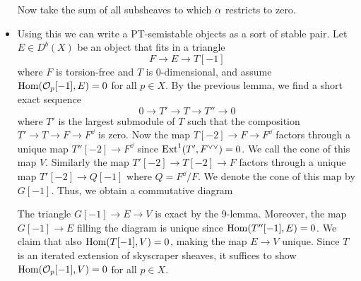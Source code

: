 \begin{itemize}
    Now take the sum of all subsheaves to which $\alpha$ restricts to zero. 
    
    \item Using this we can write a PT-semistable objects as a sort of stable pair. Let $E \in D^b(X)$ be an object that fits in a triangle
    \[ F \to E \to T[-1] \]
    where $F$ is torsion-free and $T$ is 0-dimensional, and assume $\mathrm{Hom}(\mathcal{O}_p[-1], E) = 0$ for all $p \in X$. By the previous lemma, we find a short exact sequence 
    \[ 0 \to T' \to T \to T'' \to 0 \]
    where $T'$ is the largest submodule of $T$ such that the composition $T' \to T \to F \to F^\dd$ is zero. Now the map $T[-2] \to F \to F^\dd$ factors through a unique map $T''[-2] \to F^\dd$ since $\mathrm{Ext}^1(T', F^{\vee\vee}) = 0$. We call the cone of this map $V$. Similarly the map $T'[-2] \to T[-2] \to F$ factors through a unique map $T'[-2] \to Q[-1]$ where $Q = F^\dd/F$. We denote the cone of this map by $G[-1]$. Thus, we obtain a commutative diagram
    \begin{center}
    \end{center}
    The triangle $G[-1] \to E \to V$ is exact by the 9-lemma. Moreover, the map $G[-1] \to E$ filling the diagram is unique since $\mathrm{Hom}(T''[-1], E) = 0$. We claim that also $\mathrm{Hom}(T[-1], V) = 0$, making the map $E \to V$ unique. Since $T$ is an iterated extension of skyscraper sheaves, it suffices to show $\mathrm{Hom}(\mathcal{O}_p[-1], V) = 0$ for all $p \in X$. 
    

\end{itemize}
